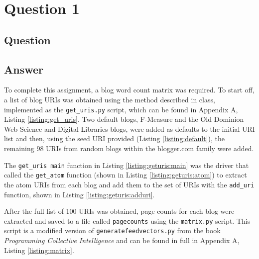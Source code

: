 \section{Question 1}

\subsection{Question}


\subsection{Answer}
To complete this assignment, a blog word count matrix was required. To start off, a list of blog URIs was obtained using the method described in class, implemented as the {\tt get\_uris.py} script, which can be found in Appendix A, Listing \ref{listing:get_uris}. Two default blogs, F-Measure and the Old Dominion Web Science and Digital Libraries blogs, were added as defaults to the initial URI list and then, using the seed URI provided (Listing \ref{listing:default}), the remaining 98 URIs from random blogs within the blogger.com family were added.



The {\tt get\_uris main} function in Listing \ref{listing:geturis:main} was the driver that called the {\tt get\_atom} function (shown in Listing \ref{listing:geturis:atom}) to extract the atom \cite{atom} URIs from each blog and add them to the set of URIs with the {\tt add\_uri} function, shown in Listing \ref{listing:geturis:adduri}.



\clearpage





After the full list of 100 URIs was obtained, page counts for each blog were extracted and saved to a file called {\tt pagecounts} using the {\tt matrix.py} script. This script is a modified version of {\tt generatefeedvectors.py} from the book {\it Programming Collective Intelligence} \cite{pci} and can be found in full in Appendix A, Listing \ref{listing:matrix}. 

